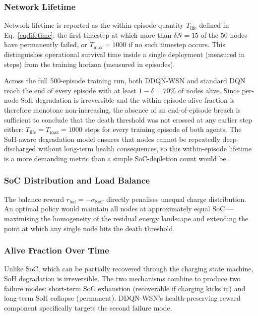 \documentclass[journal]{IEEEtran}
\begin{document}
\subsubsection{Network Lifetime}

Network lifetime is reported as the within-episode quantity
$T_{\text{life}}$ defined in Eq.~\eqref{eq:lifetime}: the first
timestep at which more than $\delta N = 15$ of the $50$ nodes have
permanently failed, or $T_{\max} = 1000$ if no such timestep occurs.
This distinguishes operational survival time inside a single
deployment (measured in steps) from the training horizon (measured
in episodes).

Across the full 500-episode training run, both DDQN-WSN and standard
DQN reach the end of every episode with at least $1 - \delta = 70\%$
of nodes alive. Since per-node SoH degradation is irreversible and
the within-episode alive fraction is therefore monotone
non-increasing, the absence of an end-of-episode breach is sufficient
to conclude that the death threshold was not crossed at any earlier
step either: $T_{\text{life}} = T_{\max} = 1000$ steps for every
training episode of both agents. The SoH-aware degradation model
ensures that nodes cannot be repeatedly deep-discharged without
long-term health consequences, so this within-episode lifetime is a
more demanding metric than a simple SoC-depletion count would be.

\subsubsection{SoC Distribution and Load Balance}



The balance reward $r_{\text{bal}} = -\sigma_{\text{SoC}}$ directly penalises unequal charge distribution. An optimal policy would maintain all nodes at approximately equal SoC — maximising the homogeneity of the residual energy landscape and extending the point at which any single node hits the death threshold.

\subsubsection{Alive Fraction Over Time}



Unlike SoC, which can be partially recovered through the charging state machine, SoH degradation is irreversible. The two mechanisms combine to produce two failure modes: short-term SoC exhaustion (recoverable if charging kicks in) and long-term SoH collapse (permanent). DDQN-WSN's health-preserving reward component specifically targets the second failure mode.
\end{document}
